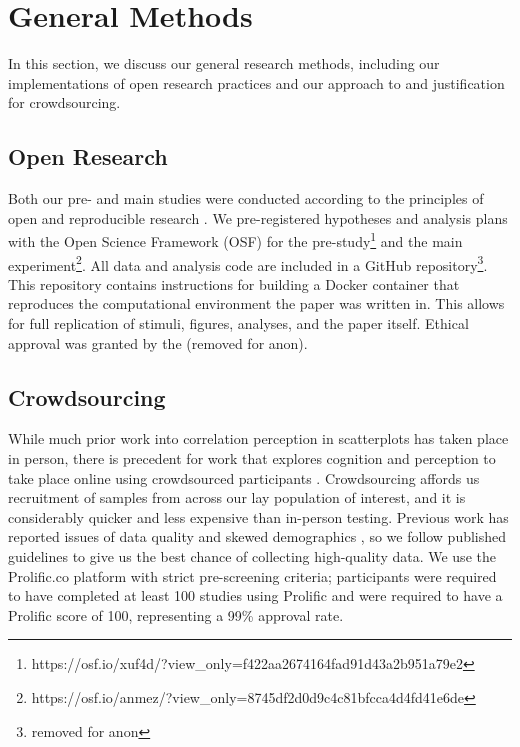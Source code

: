 \documentclass[manuscript,screen,review,anonymous]{acmart}
\begin{document}
\section{General Methods}\label{sec-general-methods}

In this section, we discuss our general research methods, including our
implementations of open research practices and our approach to and
justification for crowdsourcing.

\subsection{Open Research}\label{sec-open-research}

Both our pre- and main studies were conducted according to the
principles of open and reproducible research \citep{ayris_2018}. We
pre-registered hypotheses and analysis plans with the Open Science
Framework (OSF) for the pre-study\footnote{https://osf.io/xuf4d/?view\_only=f422aa2674164fad91d43a2b951a79e2}
and the main experiment\footnote{https://osf.io/anmez/?view\_only=8745df2d0d9c4c81bfcca4d4fd41e6de}.
All data and analysis code are included in a GitHub
repository\footnote{removed for anon}. This repository contains
instructions for building a Docker container \citep{merkel_2014} that
reproduces the computational environment the paper was written in. This
allows for full replication of stimuli, figures, analyses, and the paper
itself. Ethical approval was granted by the (removed for anon).

\subsection{Crowdsourcing}\label{sec-crowdsourcing}

While much prior work into correlation perception in scatterplots has
taken place in person, there is precedent for work that explores
cognition and perception to take place online using crowdsourced
participants \citep{xiong_2022}. Crowdsourcing affords us recruitment of
samples from across our lay population of interest, and it is
considerably quicker and less expensive than in-person testing. Previous
work has reported issues of data quality and skewed demographics
\citep{chmielewski_2020, charalambides_2021, peer_2021}, so we follow
published guidelines \citep{peer_2021} to give us the best chance of
collecting high-quality data. We use the Prolific.co platform
\citep{prolific} with strict pre-screening criteria; participants were
required to have completed at least 100 studies using Prolific and were
required to have a Prolific score of 100, representing a 99\% approval
rate.
\end{document}
